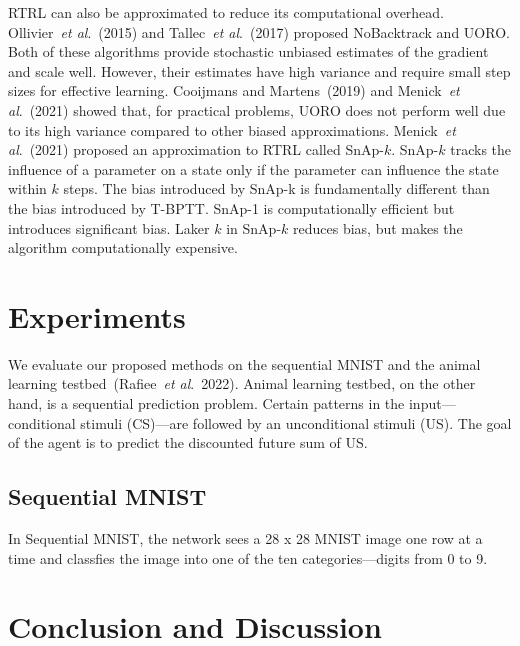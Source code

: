\documentclass{article}
\newcommand{\etal}{\textit{et al}.}
\begin{document}
RTRL can also be approximated to reduce its computational overhead. Ollivier~\etal~(2015) and Tallec~\etal~(2017) proposed NoBacktrack and UORO. Both of these algorithms provide stochastic unbiased estimates of the gradient and scale well. However, their estimates have high variance and require small step sizes for effective learning. Cooijmans and Martens~(2019) and Menick~\etal~(2021) showed that, for practical problems, UORO does not perform well due to its high variance compared to other biased approximations. Menick~\etal~(2021) proposed an approximation to RTRL called SnAp-$k$. SnAp-$k$ tracks the influence of a parameter on a state only if the parameter can influence the state within $k$ steps. The bias introduced by SnAp-k is fundamentally different than the bias introduced by T-BPTT. SnAp-1 is computationally efficient but introduces significant bias. Laker $k$ in SnAp-$k$ reduces bias, but makes the algorithm computationally expensive.  


\section{Experiments}
We evaluate our proposed methods on the sequential MNIST and the animal learning testbed~(Rafiee~\etal~2022). Animal learning testbed, on the other hand, is a sequential prediction problem. Certain patterns in the input---conditional stimuli (CS)---are followed by an unconditional stimuli (US). The goal of the agent is to predict the discounted future sum of US. 
\subsection{Sequential MNIST}
In Sequential MNIST, the network sees a 28 x 28 MNIST image one row at a time and classfies the image into one of the ten categories---digits from 0 to 9.  






\section{Conclusion and Discussion} 
\end{document}
